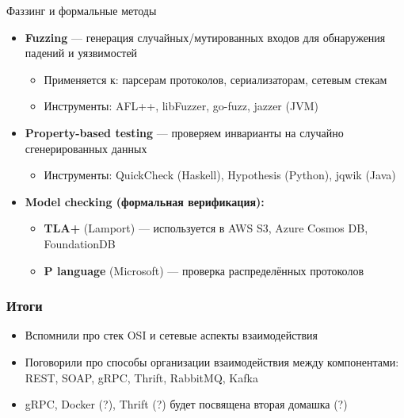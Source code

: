 \documentclass{beamer}
\begin{document}
\begin{frame}{Фаззинг и формальные методы}
\begin{itemize}
  \item \textbf{Fuzzing} --- генерация случайных/мутированных входов для обнаружения падений и уязвимостей
  \begin{itemize}
    \item Применяется к: парсерам протоколов, сериализаторам, сетевым стекам
    \item Инструменты: AFL++, libFuzzer, go-fuzz, jazzer (JVM)
  \end{itemize}
  \item \textbf{Property-based testing} --- проверяем инварианты на случайно сгенерированных данных
  \begin{itemize}
    \item Инструменты: QuickCheck (Haskell), Hypothesis (Python), jqwik (Java)
  \end{itemize}
  \item \textbf{Model checking (формальная верификация):}
  \begin{itemize}
    \item \textbf{TLA+} (Lamport) --- используется в AWS S3, Azure Cosmos DB, FoundationDB
    \item \textbf{P language} (Microsoft) --- проверка распределённых протоколов
  \end{itemize}
\end{itemize}
\end{frame}


\begin{frame}
\frametitle{Итоги}

\begin{itemize}
  \item Вспомнили про стек OSI и сетевые аспекты взаимодействия
  \item Поговорили про способы организации взаимодействия между компонентами: REST, SOAP, gRPC, Thrift, RabbitMQ, Kafka
  \item gRPC, Docker (?), Thrift (?) будет посвящена вторая домашка (?)
\end{itemize}

\end{frame}
\end{document}
